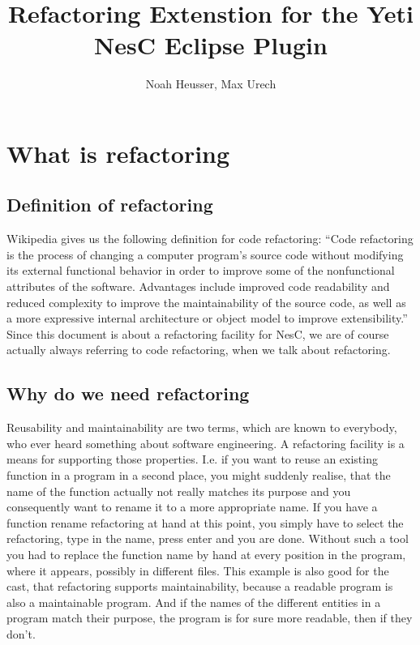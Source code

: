 \documentclass[a4paper,10pt]{report}
\title{Refactoring Extenstion for the Yeti NesC Eclipse Plugin}
\author{Noah Heusser, Max Urech}
\begin{document}
\maketitle

\begin{abstract}
\end{abstract}

\tableofcontents

\part{What is refactoring}
\chapter{Definition of refactoring}
Wikipedia gives us the following definition for code refactoring:
``Code refactoring is the process of changing a computer program's source code without modifying its external functional behavior in order to improve some of the nonfunctional attributes of the software. 
Advantages include improved code readability  and reduced complexity to improve the maintainability of the source code, as well as a more expressive internal architecture or object model to improve extensibility.''
Since this document is about a refactoring facility for NesC, we are of course actually always referring to code refactoring, when we talk about refactoring.

\chapter{Why do we need refactoring}
Reusability and maintainability are two terms, which are known to everybody, who ever heard something about software engineering. 
A refactoring facility is a means for supporting those properties. I.e. if you want to reuse an existing function in a program in a second place,
you might suddenly realise, that the name of the function actually not really matches its purpose and you consequently want to rename it to a more appropriate name.
If you have a function rename refactoring at hand at this point, you simply have to select the refactoring, type in the name, press enter and you are done. 
Without such a tool you had to replace the function name by hand at every position in the program, where it appears, possibly in different files.
This example is also good for the cast, that refactoring supports maintainability, because a readable program is also a maintainable program. 
And if the names of the different entities in a program match their purpose, the program is for sure more readable, then if they don't.
\end{document}

